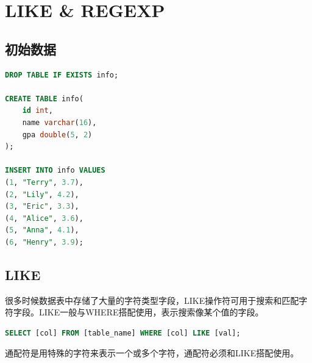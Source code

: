 \documentclass[12pt, openany, oneside]{book}
\begin{document}
\newpage

\chapter{LIKE \& REGEXP}

\section{初始数据}


\begin{lstlisting}[language=SQL]
DROP TABLE IF EXISTS info;

CREATE TABLE info(
    id int,
    name varchar(16),
    gpa double(5, 2)
);

INSERT INTO info VALUES
(1, "Terry", 3.7),
(2, "Lily", 4.2),
(3, "Eric", 3.3),
(4, "Alice", 3.6),
(5, "Anna", 4.1),
(6, "Henry", 3.9);
\end{lstlisting}

\vspace{0.5cm}

\section{LIKE}

很多时候数据表中存储了大量的字符类型字段，LIKE操作符可用于搜索和匹配字符字段。LIKE一般与WHERE搭配使用，表示搜索像某个值的字段。

\vspace{-0.5cm}

\begin{lstlisting}[language=SQL]
SELECT [col] FROM [table_name] WHERE [col] LIKE [val];
\end{lstlisting}

通配符是用特殊的字符来表示一个或多个字符，通配符必须和LIKE搭配使用。

\begin{table}[H]
	\centering
	\caption{通配符}
\end{table}
\end{document}
